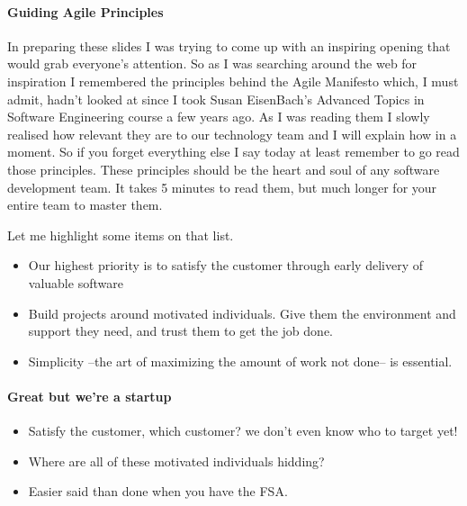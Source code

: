 \documentclass{article}
\begin{document}
\paragraph{Guiding Agile Principles}
In preparing these slides I was trying to come up with an inspiring
opening that would grab everyone's attention.
%
So as I was searching around the web for inspiration I remembered the
principles behind the Agile Manifesto which, I must admit, hadn't
looked at since I took Susan EisenBach's Advanced Topics in Software
Engineering course a few years ago.
%
As I was reading them I slowly realised how relevant they are to our
technology team and I will explain how in a moment.
%
So if you forget everything else I say today at least remember to go
read those principles. These principles should be the heart and soul
of any software development team.
%
It takes 5 minutes to read them, but much longer for your entire team
to master them.

Let me highlight some items on that list.

\begin{itemize}
\item Our highest priority is to satisfy the customer through early
  delivery of valuable software

\item Build projects around motivated individuals.  Give them the
  environment and support they need, and trust them to get the job
  done.

\item Simplicity --the art of maximizing the amount of work not done--
  is essential.
\end{itemize}

\paragraph{Great but we're a startup}
\begin{itemize}
\item Satisfy the customer, which customer? we don't even know who to
  target yet!

\item Where are all of these motivated individuals hidding?

\item Easier said than done when you have the FSA.
\end{itemize}
\end{document}
